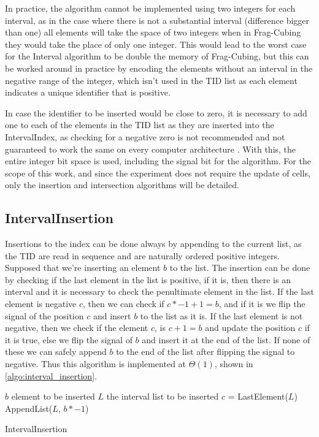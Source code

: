 In practice, the algorithm cannot be implemented using two integers for each interval, as in the case where there is not a substantial interval (difference bigger than one) all elements will take the space of two integers when in Frag-Cubing they would take the place of only one integer.
This would lead to the worst case for the Interval algorithm to be double the memory of Frag-Cubing, but this can be worked around in practice by encoding the elements without an interval in the negative range of the integer, which isn't used in the TID list as each element indicates a unique identifier that is positive.

In case the identifier to be inserted would be close to zero, it is necessary to add one to each of the elements in the TID list as they are inserted into the IntervalIndex, as checking for a negative zero is not recommended and not guaranteed to work the same on every computer architecture \cite{ieeeIEEEStandardFloatingPoint2019}.
With this, the entire integer bit space is used, including the signal bit for the algorithm.
For the scope of this work, and since the experiment does not require the update of cells, only the insertion and intersection algorithms will be detailed.

\subsection{IntervalInsertion}\label{ch:interval:algo:insertion}

Insertions to the index can be done always by appending to the current list, as the TID are read in sequence and are naturally ordered positive integers.
Supposed that we're inserting an element $b$ to the list.
The insertion can be done by checking if the last element in the list is positive, if it is, then there is an interval and it is necessary to check the penultimate element in the list.
If the last element is negative $c$, then we can check if $c * -1 + 1 = b$, and if it is we flip the signal of the position $c$ and insert $b$ to the list as it is.
If the last element is not negative, then we check if the element $c$, is $c + 1 = b$ and update the position $c$ if it is true, else we flip the signal of $b$ and insert it at the end of the list.
If none of these we can safely append $b$ to the end of the list after flipping the signal to negative.
Thus this algorithm is implemented at $\Theta(1)$, shown in \autoref{algo:interval_insertion}.

\begin{algorithm}[!htb]
\SetAlgoLined
{}
 $b$ element to be inserted\;
 $L$ the interval list to be inserted\;
 $c$ = LastElement($L$)\;
 AppendList($L$, $b * - 1$) 
 \caption{IntervalInsertion}\label{algo:interval_insertion}
\end{algorithm}

